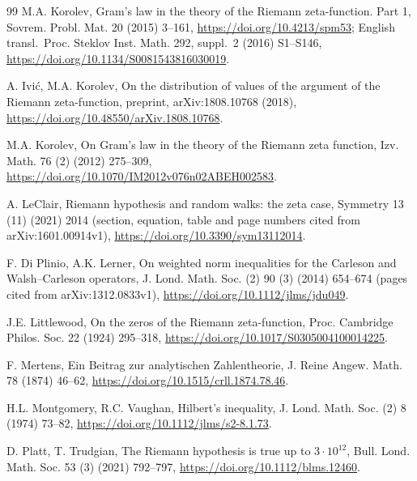 \documentclass[preprint,12pt]{elsarticle}
\numberwithin{equation}{section}
\theoremstyle{plain}
\theoremstyle{definition}
\theoremstyle{remark}
\begin{document}
\begin{thebibliography}{99}
M.A. Korolev, Gram\textquoteright s law in the theory of the Riemann zeta-function. Part 1, Sovrem. Probl. Mat. 20 (2015) 3--161, \href{https://doi.org/10.4213/spm53}{https://doi.org/10.4213/spm53}; English transl.\ Proc. Steklov Inst. Math. 292, suppl.~2 (2016) S1--S146, \href{https://doi.org/10.1134/S0081543816030019}{https://doi.org/10.1134/S0081543816030019}.

A. Ivi\'c, M.A. Korolev, On the distribution of values of the argument of the Riemann zeta-function, preprint, arXiv:1808.10768 (2018), \href{https://doi.org/10.48550/arXiv.1808.10768}{https://doi.org/10.48550/arXiv.1808.10768}.

M.A. Korolev, On Gram's law in the theory of the Riemann zeta function, Izv. Math. 76 (2) (2012) 275--309, \href{https://doi.org/10.1070/IM2012v076n02ABEH002583}{https://doi.org/10.1070/IM2012v076n02ABEH002583}.


A. LeClair, Riemann hypothesis and random walks: the zeta case, Symmetry 13 (11) (2021) 2014 (section, equation, table and page numbers cited from arXiv:1601.00914v1), \href{https://doi.org/10.3390/sym13112014}{https://doi.org/10.3390/sym13112014}.

F. Di Plinio, A.K. Lerner, On weighted norm inequalities for the Carleson and Walsh--Carleson operators, J. Lond. Math. Soc. (2) 90 (3) (2014) 654--674 (pages cited from arXiv:1312.0833v1), \href{https://doi.org/10.1112/jlms/jdu049}{https://doi.org/10.1112/jlms/jdu049}.

J.E. Littlewood, On the zeros of the Riemann zeta-function, Proc. Cambridge Philos. Soc. 22 (1924) 295--318, \href{https://doi.org/10.1017/S0305004100014225}{https://doi.org/10.1017/S0305004100014225}.

F. Mertens, Ein Beitrag zur analytischen Zahlentheorie, J. Reine Angew. Math. 78 (1874) 46--62, \href{https://doi.org/10.1515/crll.1874.78.46}{https://doi.org/10.1515/crll.1874.78.46}.

H.L. Montgomery, R.C. Vaughan, Hilbert's inequality, J. Lond. Math. Soc. (2) 8 (1974) 73--82, \href{https://doi.org/10.1112/jlms/s2-8.1.73}{https://doi.org/10.1112/jlms/s2-8.1.73}.

D. Platt, T. Trudgian, The Riemann hypothesis is true up to $3\cdot10^{12}$, Bull. Lond. Math. Soc. 53 (3) (2021) 792--797, \href{https://doi.org/10.1112/blms.12460}{https://doi.org/10.1112/blms.12460}.


\end{thebibliography}
\end{document}

